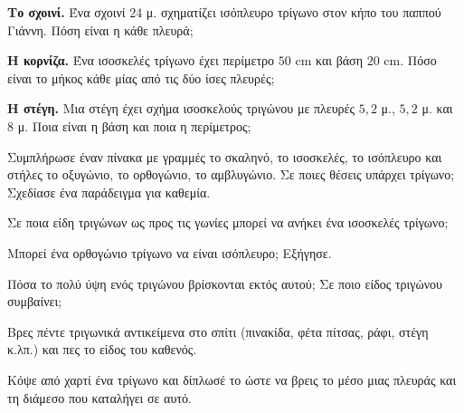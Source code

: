 \ex \textbf{Το σχοινί.} Ένα σχοινί $24$ μ. σχηματίζει ισόπλευρο τρίγωνο στον κήπο του παππού Γιάννη. Πόση είναι η κάθε πλευρά;

\ex \textbf{Η κορνίζα.} Ένα ισοσκελές τρίγωνο έχει περίμετρο $50$ cm και βάση $20$ cm. Πόσο είναι το μήκος κάθε μίας από τις δύο ίσες πλευρές;

\ex \textbf{Η στέγη.} Μια στέγη έχει σχήμα ισοσκελούς τριγώνου με πλευρές $5{,}2$ μ., $5{,}2$ μ. και $8$ μ. Ποια είναι η βάση και ποια η περίμετρος;


\ex Συμπλήρωσε έναν πίνακα με γραμμές το σκαληνό, το ισοσκελές, το ισόπλευρο και στήλες το οξυγώνιο, το ορθογώνιο, το αμβλυγώνιο. Σε ποιες θέσεις υπάρχει τρίγωνο; Σχεδίασε ένα παράδειγμα για καθεμία.

\ex Σε ποια είδη τριγώνων ως προς τις γωνίες μπορεί να ανήκει ένα ισοσκελές τρίγωνο;

\ex Μπορεί ένα ορθογώνιο τρίγωνο να είναι ισόπλευρο; Εξήγησε.

\ex Πόσα το πολύ ύψη ενός τριγώνου βρίσκονται εκτός αυτού; Σε ποιο είδος τριγώνου συμβαίνει;


\ex Βρες πέντε τριγωνικά αντικείμενα στο σπίτι (πινακίδα, φέτα πίτσας, ράφι, στέγη κ.λπ.) και πες το είδος του καθενός.

\ex Κόψε από χαρτί ένα τρίγωνο και δίπλωσέ το ώστε να βρεις το μέσο μιας πλευράς και τη διάμεσο που καταλήγει σε αυτό.
